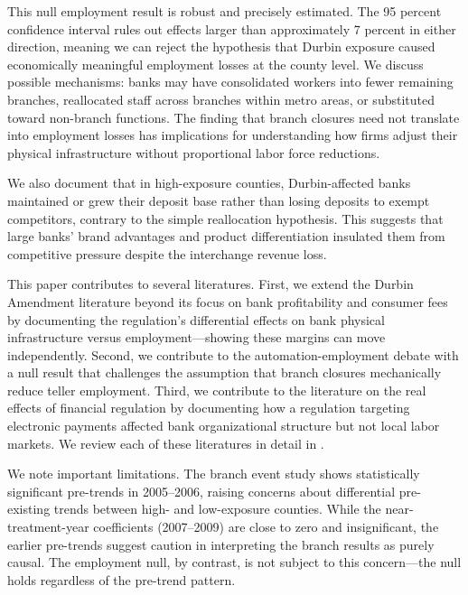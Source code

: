 \documentclass[12pt]{article}
\begin{document}
This null employment result is robust and precisely estimated. The 95 percent confidence interval rules out effects larger than approximately 7 percent in either direction, meaning we can reject the hypothesis that Durbin exposure caused economically meaningful employment losses at the county level. We discuss possible mechanisms: banks may have consolidated workers into fewer remaining branches, reallocated staff across branches within metro areas, or substituted toward non-branch functions. The finding that branch closures need not translate into employment losses has implications for understanding how firms adjust their physical infrastructure without proportional labor force reductions.

We also document that in high-exposure counties, Durbin-affected banks maintained or grew their deposit base rather than losing deposits to exempt competitors, contrary to the simple reallocation hypothesis. This suggests that large banks' brand advantages and product differentiation insulated them from competitive pressure despite the interchange revenue loss.

This paper contributes to several literatures. First, we extend the Durbin Amendment literature beyond its focus on bank profitability and consumer fees \citep{kay2014, wang2014, mukharlyamov2023} by documenting the regulation's differential effects on bank physical infrastructure versus employment---showing these margins can move independently. Second, we contribute to the automation-employment debate \citep{acemoglu2019, autor2015, bessen2015} with a null result that challenges the assumption that branch closures mechanically reduce teller employment. Third, we contribute to the literature on the real effects of financial regulation \citep{drechsler2017, jiang2020} by documenting how a regulation targeting electronic payments affected bank organizational structure but not local labor markets. We review each of these literatures in detail in .

We note important limitations. The branch event study shows statistically significant pre-trends in 2005--2006, raising concerns about differential pre-existing trends between high- and low-exposure counties. While the near-treatment-year coefficients (2007--2009) are close to zero and insignificant, the earlier pre-trends suggest caution in interpreting the branch results as purely causal. The employment null, by contrast, is not subject to this concern---the null holds regardless of the pre-trend pattern.
\end{document}
